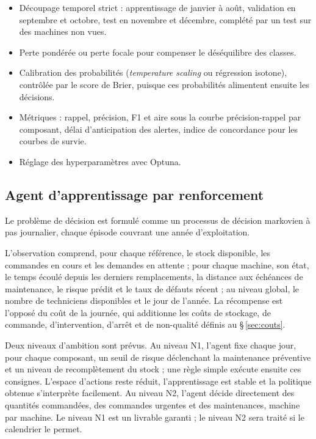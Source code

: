 \documentclass[11pt,a4paper]{article}
\newcommand{\intertitre}[1]{\par\vspace{0.3em}{\sffamily\bfseries\color{primaire}#1}\par\vspace{-0.2em}}
\begin{document}
\intertitre{Protocole}
\begin{itemize}
\item Découpage temporel strict : apprentissage de janvier à août, validation en septembre et octobre, test en novembre et décembre, complété par un test sur des machines non vues.
\item Perte pondérée ou perte focale \cite{focal} pour compenser le déséquilibre des classes.
\item Calibration des probabilités (\emph{temperature scaling} ou régression isotone), contrôlée par le score de Brier, puisque ces probabilités alimentent ensuite les décisions.
\item Métriques : rappel, précision, F1 et aire sous la courbe précision-rappel par composant, délai d'anticipation des alertes, indice de concordance pour les courbes de survie.
\item Réglage des hyperparamètres avec Optuna.
\end{itemize}

\subsection{Agent d'apprentissage par renforcement}

Le problème de décision est formulé comme un processus de décision markovien à pas journalier, chaque épisode couvrant une année d'exploitation.

L'observation comprend, pour chaque référence, le stock disponible, les commandes en cours et les demandes en attente ; pour chaque machine, son état, le temps écoulé depuis les derniers remplacements, la distance aux échéances de maintenance, le risque prédit et le taux de défauts récent ; au niveau global, le nombre de techniciens disponibles et le jour de l'année. La récompense est l'opposé du coût de la journée, qui additionne les coûts de stockage, de commande, d'intervention, d'arrêt et de non-qualité définis au §\,\ref{sec:couts}.

Deux niveaux d'ambition sont prévus. Au niveau N1, l'agent fixe chaque jour, pour chaque composant, un seuil de risque déclenchant la maintenance préventive et un niveau de recomplètement du stock ; une règle simple exécute ensuite ces consignes. L'espace d'actions reste réduit, l'apprentissage est stable et la politique obtenue s'interprète facilement. Au niveau N2, l'agent décide directement des quantités commandées, des commandes urgentes et des maintenances, machine par machine. Le niveau N1 est un livrable garanti ; le niveau N2 sera traité si le calendrier le permet.
\end{document}

